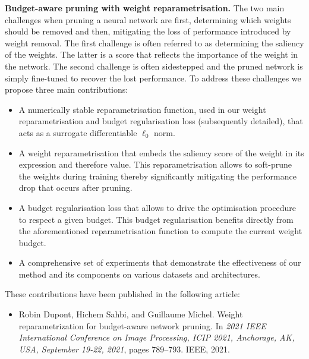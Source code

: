\noindent \textbf{Budget-aware pruning with weight reparametrisation.} The two
main challenges when pruning a neural network are first, determining which
weights should be removed and then, mitigating the loss of performance
introduced by weight removal. The first challenge is often referred to as
determining the saliency of the weights. The latter is a score that reflects the
importance of the weight in the network. The second challenge is often
sidestepped and the pruned network is simply fine-tuned to recover the lost
performance. To address these challenges we propose three main contributions:

\begin{itemize}
    \item A numerically stable reparametrisation function, used in our weight
          reparametrisation and budget regularisation loss (subsequently
          detailed), that acts as a surrogate differentiable $\ell_0$ norm.

    \item A weight reparametrisation that embeds the saliency score of the
          weight in its expression and therefore value. This reparametrisation
          allows to soft-prune the weights during training thereby significantly
          mitigating the performance drop that occurs after pruning.

    \item A budget regularisation loss that allows to drive the optimisation
          procedure to respect a given budget. This budget regularisation
          benefits directly from the aforementioned reparametrisation function
          to compute the current weight budget.

    \item A comprehensive set of experiments that demonstrate the effectiveness
          of our method and its components on various datasets and
          architectures.\\
\end{itemize}

\noindent These contributions have been published in the following article:
\begin{itemize}
    \item Robin Dupont, Hichem Sahbi, and Guillaume Michel. Weight reparametrization for
          budget-aware network pruning. In \emph{2021 IEEE International Conference on Image
              Processing, ICIP 2021, Anchorage, AK, USA, September 19-22, 2021}, pages 789–793.
          IEEE, 2021.\\
\end{itemize}



